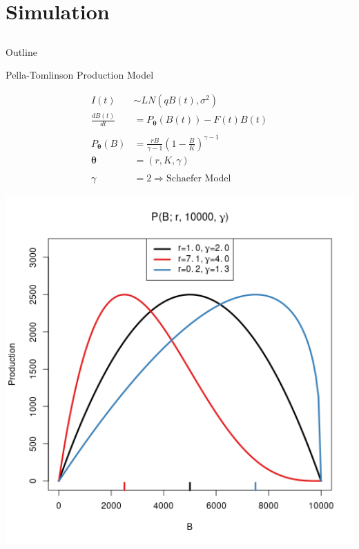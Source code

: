 \documentclass[ xcolor = pdftex, dvipsnames, table ]{beamer}
\begin{document}
%
\section{Simulation}
\subsection{}
\begin{frame}{Outline}
\end{frame}

%
\begin{frame}{Pella-Tomlinson Production Model}
\begin{minipage}[h!]{0.54\textwidth}
\begin{align*}
        I(t) &\sim LN(qB(t), \sigma^2)\\
        \frac{dB(t)}{dt} &= P_{\bm{\theta}}(B(t)) - F(t)B(t)\\
	~&~\\
        P_{\bm{\theta}}(B) &= \frac{rB}{\gamma-1} \left(1-\frac{B}{K}\right)^{\gamma-1}\\
        \bm{\theta} &= (r, K, \gamma)\\
        ~&~\\
        \gamma &= 2 \Rightarrow \text{Schaefer Model}
\end{align*}
\end{minipage}
\begin{minipage}[h!]{0.44\textwidth}
\includegraphics[width=1.15\textwidth]{../plots/srr1.1.png}
\end{minipage}
\end{frame}
\end{document}
